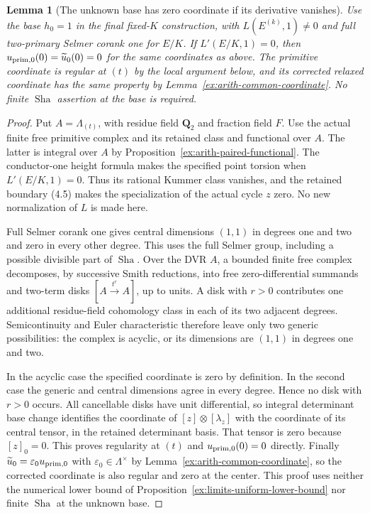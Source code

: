\documentclass[11pt]{article}
\newtheorem{lemma}[theorem]{Lemma}
\theoremstyle{definition}
\theoremstyle{remark}
\newcommand{\Sha}{\operatorname{Sha}}
\begin{document}
\begin{lemma}[The unknown base has zero coordinate if its derivative vanishes]\label{ex:arith-base-zero}
Use the base $h_0=1$ in the final fixed-$K$ construction, with
$L(E^{(k)},1)\ne0$ and full two-primary Selmer corank one for
$E/K$. If $L'(E/K,1)=0$, then
$u_{{\rm prim},0}(0)=\widetilde u_0(0)=0$ for the same coordinates
as above. The primitive coordinate is regular at $(t)$ by the local
argument below, and its corrected relaxed coordinate has the same
property by Lemma~\ref{ex:arith-common-coordinate}. No finite
$\Sha$ assertion at the base is required.
\end{lemma}
\begin{proof}\leavevmode
Put $A=\Lambda_{(t)}$, with residue field $\mathbf Q_2$ and
fraction field $F$. Use the actual finite free primitive complex
and its retained class and functional over $A$. The latter is
integral over $A$ by Proposition~\ref{ex:arith-paired-functional}.
The conductor-one height formula makes the specified point torsion
when $L'(E/K,1)=0$. Thus its rational Kummer class vanishes, and
the retained boundary (4.5) makes the specialization of the actual
cycle $z$ zero. No new normalization of $L$ is made here.

Full Selmer corank one gives central dimensions $(1,1)$ in degrees
one and two and zero in every other degree. This uses the full
Selmer group, including a possible divisible part of $\Sha$.
Over the DVR $A$, a bounded finite free complex decomposes, by
successive Smith reductions, into free zero-differential summands
and two-term disks $[A\xrightarrow{t^r}A]$, up to units. A disk
with $r>0$ contributes one additional residue-field cohomology
class in each of its two adjacent degrees. Semicontinuity and
Euler characteristic therefore leave only two generic possibilities:
the complex is acyclic, or its dimensions are $(1,1)$ in degrees
one and two.

In the acyclic case the specified coordinate is zero by definition.
In the second case the generic and central dimensions agree in
every degree. Hence no disk with $r>0$ occurs. All cancellable
disks have unit differential, so integral determinant base change
identifies the coordinate of $[z]\otimes[\lambda_z]$ with the
coordinate of its central tensor, in the retained determinant basis.
That tensor is zero because $[z]_0=0$. This proves regularity at
$(t)$ and $u_{{\rm prim},0}(0)=0$ directly. Finally
$\widetilde u_0=\varepsilon_0u_{{\rm prim},0}$ with
$\varepsilon_0\in\Lambda^\times$ by
Lemma~\ref{ex:arith-common-coordinate}, so the corrected coordinate
is also regular and zero at the center. This proof uses neither
the numerical lower bound of Proposition~\ref{ex:limits-uniform-lower-bound}
nor finite $\Sha$ at the unknown base.
\end{proof}
\end{document}
